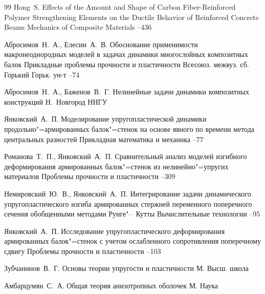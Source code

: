 \begin{thebibliography}{99}
\by Hong~S.
\paper Effects of the Amount and Shape of Carbon Fiber-Reinforced Polymer Strengthening Elements on the Ductile Behavior of Reinforced Concrete Beams
\jour Mechanics of Composite Materials
--436

\by Абросимов~Н.~А., Елесин~А.~В.
\paper Обоснование применимости макронеоднородных моделей в задачах динамики многослойных композитных балок
\inbook Прикладные проблемы прочности и пластичности
\bookinfo Всесоюз. межвуз. сб. \nofrills
\publaddr Горький
\publ Горьк. ун-т
--74

\by Абросимов~Н.~А., Баженов~В.~Г.
\book Нелинейные задачи динамики композитных конструкций
\publaddr Н.~Новгород
\publ ННГУ

\by Янковский~А.~П.
\paper Моделирование упругопластической динамики продольно"=армированных балок"=стенок на основе явного по времени метода центральных разностей
\jour Прикладная математика и механика
--77

\by Романова~Т.~П., Янковский~А.~П.
\paper Сравнительный анализ моделей изгибного деформирования армированных балок"=стенок из нелинейно"=упругих материалов
\jour Проблемы прочности и пластичности
--309

\by Немировский~Ю.~В., Янковский~А.~П.
\paper Интегрирование задачи динамического упругопластического изгиба армированных стержней
переменного поперечного сечения обобщенными методами Рунге"--~Кутты
\jour Вычислительные технологии
--95

\by Янковский~А.~П.
\paper Исследование упругопластического деформирования армированных балок"=стенок с учетом ослабленного
сопротивления поперечному сдвигу
\jour Проблемы прочности и пластичности
--103

\by Зубчанинов~В.~Г.
\book Основы теории упругости и пластичности
\publaddr М.
\publ Высш. школа

\by Амбарцумян~С.~А.
\book Общая теория анизотропных оболочек
\publaddr М.
\publ Наука


\end{thebibliography}
